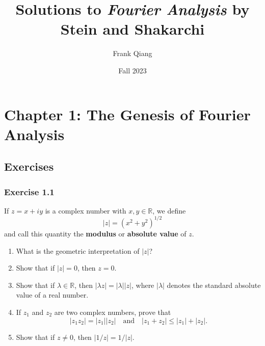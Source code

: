 \documentclass[letterpaper, 12pt]{article}
\title{Solutions to \textit{Fourier Analysis} by Stein and Shakarchi}
\author{Frank Qiang}
\date{Fall 2023}
\newcommand{\R}{\mathbb{R}}
\begin{document}
\maketitle
\tableofcontents

\section{Chapter 1: The Genesis of Fourier Analysis}
\subsection{Exercises}

\subsubsection{Exercise 1.1}
\begin{tcolorbox}
  If $z = x + iy$ is a complex number with $x, y \in \R$,
  we define
  \[|z| = (x^2 + y^2)^{1 / 2}\]
  and call this quantity the \textbf{modulus}
  or \textbf{absolute value} of $z$.
  \begin{enumerate}
    \item What is the geometric interpretation
      of $|z|$?
    \item Show that if $|z| = 0$, then $z = 0$.
    \item Show that if $\lambda \in \R$, then
      $|\lambda z| = |\lambda| |z|$, where $|\lambda|$
      denotes the standard absolute value of a real
      number.
    \item If $z_1$ and $z_2$ are two complex numbers,
      prove that
      \[
        |z_1 z_2| = |z_1| |z_2|
        \quad \text{and} \quad
        |z_1 + z_2| \le |z_1| + |z_2|.
      \]
    \item Show that if $z \ne 0$, then
      $|1 / z| = 1 / |z|$.
  \end{enumerate}
\end{tcolorbox}
\end{document}
